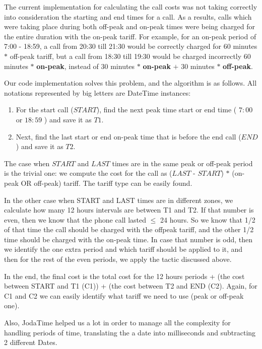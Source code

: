 \documentclass[11pt,twocolumn]{article} %
\begin{document}
The current implementation for calculating the call costs was not taking correctly into consideration 
the starting and end times for a call. As a results, calls which were taking place during both off-peak and 
on-peak times were being charged for the entire duration with the on-peak tariff. For example, for an on-peak
period of 7:00 - 18:59, a call from 20:30 till 21:30 would be correctly charged for 60 minutes $\ast$
off-peak tariff, but a call from  18:30 till 19:30 would be charged incorrectly 60 minutes $\ast$ \textbf{on-peak},
instead of 30 minutes $\ast$ \textbf{on-peak} $+$ 30 minutes $\ast$ \textbf{off-peak}.

Our code implementation solves this problem, and the algorithm is as follows. All notations represented by big letters 
are DateTime instances:
\begin{enumerate}
\item{For the start call ($START$), find the next peak time start or end time ( $7:00$ or $18:59$ ) and save it as $T1$.}

\item{Next, find the last start or end on-peak time that is before the end call ($END$) and save it as $T2$.}
\end{enumerate}

The case when $START$ and $LAST$ times are in the same peak or off-peak period is the trivial one: we compute the 
cost for the call as ($LAST$ - $START$) $\ast$ (on-peak OR off-peak) tariff. The tariff type can be easily found. 

In the other case when START and LAST times are in different zones, we calculate how many 12 hours intervals are between T1 and T2.
If that number is even, then we know that the phone call lasted $\leq$ 24 hours. So we know that 1/2 of that time the call should be 
charged with the offpeak tariff, and the other 1/2 time should be charged with the on-peak time. 
In case that number is odd, then we identify the one extra period and which tariff should be applied to it, and then for the rest of the 
even periods, we apply the tactic discussed above. 

In the end, the final cost is the total cost for the 12 hours periods + (the cost between START and T1 (C1)) + (the cost between T2 and END (C2). 
Again, for C1 and C2 we can easily identify what tariff we need to use (peak or off-peak one).

Also, JodaTime helped us a lot in order to manage all the complexity for handling periods of time,
translating the a date into milliseconds and subtracting 2 different Dates. 
\end{document}
